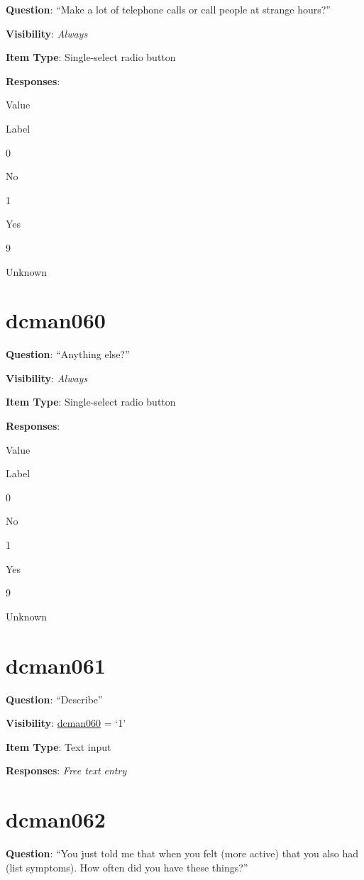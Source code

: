 \documentclass[]{book}
\begin{document}
\textbf{Question}: ``Make a lot of telephone calls or call people at strange hours?''

\textbf{Visibility}: \emph{Always}

\textbf{Item Type}: Single-select radio button

\textbf{Responses}:

Value

Label

0

No

1

Yes

9

Unknown

\hypertarget{dcman060}{%
\section{dcman060}\label{dcman060}}

\textbf{Question}: ``Anything else?''

\textbf{Visibility}: \emph{Always}

\textbf{Item Type}: Single-select radio button

\textbf{Responses}:

Value

Label

0

No

1

Yes

9

Unknown

\hypertarget{dcman061}{%
\section{dcman061}\label{dcman061}}

\textbf{Question}: ``Describe''

\textbf{Visibility}: \protect\hyperlink{dcman060}{dcman060} = `1'

\textbf{Item Type}: Text input

\textbf{Responses}: \emph{Free text entry}

\hypertarget{dcman062}{%
\section{dcman062}\label{dcman062}}

\textbf{Question}: ``You just told me that when you felt (more active) that you also had (list symptoms). How often did you have these things?''
\end{document}
